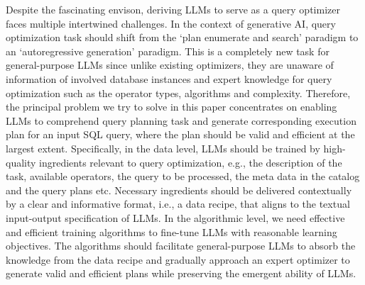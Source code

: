 Despite the fascinating envison, deriving LLMs to serve as a query optimizer faces multiple intertwined challenges.
In the context of generative AI, query optimization task should shift from the `plan enumerate and search' paradigm to an `autoregressive generation' paradigm. This is a completely new task for general-purpose LLMs since unlike existing optimizers, they are unaware of information of involved database instances and expert knowledge for query optimization such as the operator types, algorithms and complexity.
Therefore, the principal problem we try to solve in this paper concentrates on enabling LLMs to comprehend query planning task and generate corresponding execution plan for an input SQL query, where the plan should be valid and efficient at the largest extent.
Specifically, in the data level, LLMs should be trained by high-quality ingredients relevant to query optimization, e.g., the description of the task, available operators, the query to be processed, the meta data in the catalog and the query plans etc.
Necessary ingredients should be delivered contextually by a clear and informative format, i.e., a data recipe, that aligns to the textual input-output specification of LLMs. 
In the algorithmic level, we need effective and efficient training algorithms to fine-tune LLMs with reasonable learning objectives. The algorithms should facilitate general-purpose LLMs to absorb the knowledge from the data recipe and gradually approach an expert optimizer to generate valid and efficient plans while preserving the emergent ability of LLMs. 

